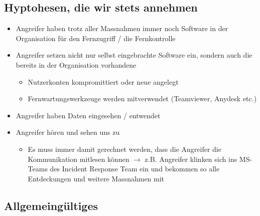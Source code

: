 \subsection{Hyptohesen, die wir stets annehmen}
\begin{itemize}
    \item Angreifer haben trotz aller Massnahmen immer noch Software in der Organisation für den Fernzugriff / die Fernkontrolle
    \item Angreifer setzen nicht nur selbst eingebrachte Software ein, sondern auch die bereits in der Organisation vorhandene
    \begin{itemize}
        \item Nutzerkonten kompromittiert oder neue angelegt
        \item Fernwartungswerkzeuge werden mitverwendet (Teamviewer, Anydesk etc.)
    \end{itemize}
    \item Angreifer haben Daten eingesehen / entwendet
    \item Angreifer \glqq hören und \glqq sehen\grqq{} uns zu
    \begin{itemize}
        \item Es muss immer damit gerechnet werden, dass die Angreifer die Kommunikation mitlesen können $\rightarrow$ z.B. Angreifer klinken sich ins MS-Teams des Incident Response Team ein und bekommen so alle Entdeckungen und weitere Massnahmen mit
    \end{itemize}
\end{itemize}

\subsection{Allgemeingültiges}

